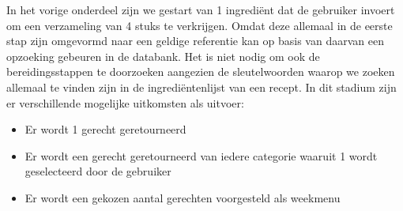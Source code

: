 \documentclass{hogent-article}
\begin{document}
In het vorige onderdeel zijn we gestart van 1 ingrediënt dat de gebruiker invoert om een verzameling van 4 stuks te verkrijgen. Omdat deze allemaal in de eerste stap zijn omgevormd naar een geldige referentie kan op basis van daarvan een opzoeking gebeuren in de databank. Het is niet nodig om ook de bereidingsstappen te doorzoeken aangezien de sleutelwoorden waarop we zoeken allemaal te vinden zijn in de ingrediëntenlijst van een recept. In dit stadium zijn er verschillende mogelijke uitkomsten als uitvoer:

\begin{itemize}
    \item Er wordt 1 gerecht geretourneerd
    \item Er wordt een gerecht geretourneerd van iedere categorie waaruit 1 wordt geselecteerd door de gebruiker
    \item Er wordt een gekozen aantal gerechten voorgesteld als weekmenu
\end{itemize}
\end{document}
